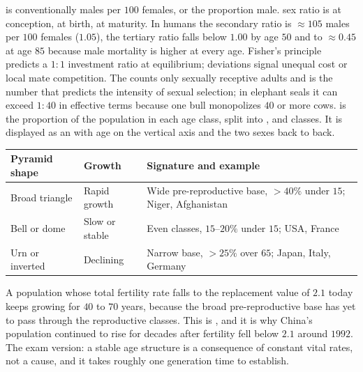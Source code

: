 \begin{defbox}[title={DEFINITIONS: sex ratio and age structure}]
 is conventionally males per $100$ females, or the proportion male.
 sex ratio is at conception,  at birth, 
at maturity. In humans the secondary ratio is $\approx 105$ males per $100$
females ($1.05$), the tertiary ratio falls below $1.00$ by age $50$ and to
$\approx 0.45$ at age $85$ because male mortality is higher at every age.
Fisher's principle predicts a $1{:}1$ investment ratio at equilibrium; deviations
signal unequal cost or local mate competition.
The  counts only sexually receptive adults and is the
number that predicts the intensity of sexual selection; in elephant seals it can
exceed $1{:}40$ in effective terms because one bull monopolizes $40$ or more cows.
 is the proportion of the population in each age class, split
into ,  and  classes.
It is displayed as an  with age on the vertical axis and the two
sexes back to back.
\end{defbox}

\begin{tabular}{@{}lp{3.0cm}p{4.4cm}@{}}
\toprule
\textbf{Pyramid shape} & \textbf{Growth} & \textbf{Signature and example}\\
\midrule
Broad triangle & Rapid growth & Wide pre-reproductive base, $>40\%$ under $15$; Niger, Afghanistan\\
Bell or dome & Slow or stable & Even classes, $15$--$20\%$ under $15$; USA, France\\
Urn or inverted & Declining & Narrow base, $>25\%$ over $65$; Japan, Italy, Germany\\
\bottomrule
\end{tabular}

\begin{obsbox}[title={WORTH NOTICING: momentum hidden in the pyramid}]
A population whose total fertility rate falls to the replacement value of
$2.1$ today keeps growing for $40$ to $70$ years, because the broad
pre-reproductive base has yet to pass through the reproductive classes. This is
, and it is why China's population continued to rise for
decades after fertility fell below $2.1$ around $1992$. The exam version: a
stable age structure is a consequence of constant vital rates, not a cause, and
it takes roughly one generation time to establish.
\end{obsbox}

